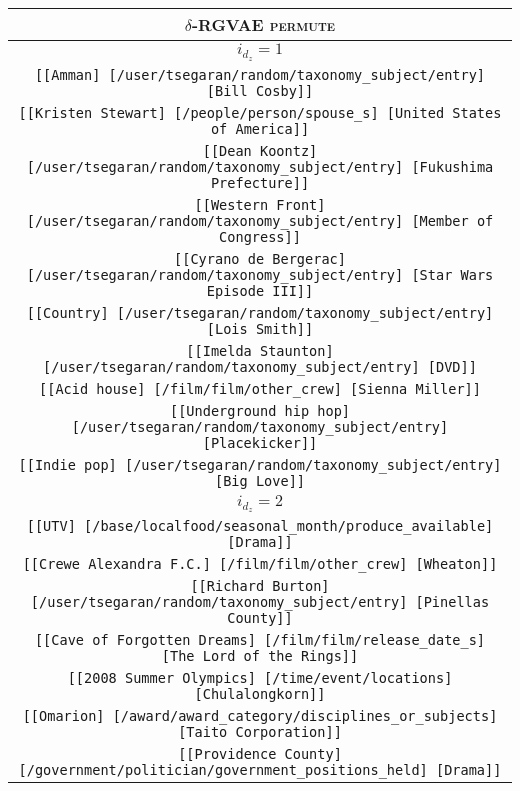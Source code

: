 \begin{longtable}{|c|}
    \hline
    \rowcolor[HTML]{EFEFEF} 
    \textsc{$\delta$-RGVAE permute}\\ \hline
    \hline 
    \rowcolor[HTML]{EFEFEF} 
    \textsc{$i_{d_z}=1$}\\ \hline 
    \texttt{[[Amman] [/user/tsegaran/random/taxonomy\_subject/entry] [Bill Cosby]]}\\
    \texttt{[[Kristen Stewart] [/people/person/spouse\_s] [United States of America]]}\\
    \texttt{[[Dean Koontz] [/user/tsegaran/random/taxonomy\_subject/entry] [Fukushima Prefecture]]}\\
    \texttt{[[Western Front] [/user/tsegaran/random/taxonomy\_subject/entry] [Member of Congress]]}\\
    \texttt{[[Cyrano de Bergerac] [/user/tsegaran/random/taxonomy\_subject/entry] [Star Wars Episode III]]}\\
    \texttt{[[Country] [/user/tsegaran/random/taxonomy\_subject/entry] [Lois Smith]]}\\
    \texttt{[[Imelda Staunton] [/user/tsegaran/random/taxonomy\_subject/entry] [DVD]]}\\
    \texttt{[[Acid house] [/film/film/other\_crew] [Sienna Miller]]}\\
    \texttt{[[Underground hip hop] [/user/tsegaran/random/taxonomy\_subject/entry] [Placekicker]]}\\
    \texttt{[[Indie pop] [/user/tsegaran/random/taxonomy\_subject/entry] [Big Love]]}\\
    \hline 
    \rowcolor[HTML]{EFEFEF} 
    \textsc{$i_{d_z}=2$}\\ \hline 
    \texttt{[[UTV] [/base/localfood/seasonal\_month/produce\_available] [Drama]]}\\
    \texttt{[[Crewe Alexandra F.C.] [/film/film/other\_crew] [Wheaton]]}\\
    \texttt{[[Richard Burton] [/user/tsegaran/random/taxonomy\_subject/entry] [Pinellas County]]}\\
    \texttt{[[Cave of Forgotten Dreams] [/film/film/release\_date\_s] [The Lord of the Rings]]}\\
    \texttt{[[2008 Summer Olympics] [/time/event/locations] [Chulalongkorn]]}\\
    \texttt{[[Omarion] [/award/award\_category/disciplines\_or\_subjects] [Taito Corporation]]}\\
    \texttt{[[Providence County] [/government/politician/government\_positions\_held] [Drama]]}\\

\end{longtable}

